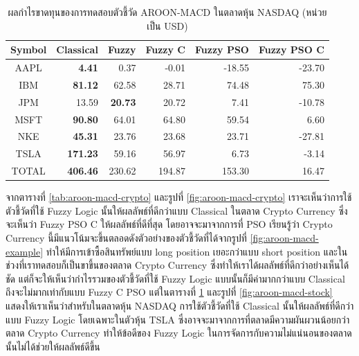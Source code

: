 \begin{table}[!h]
    \centering
    \begin{tabular}{crrrrr}
        \hline
        \textbf{Symbol} & \textbf{Classical} & \textbf{Fuzzy} & \textbf{Fuzzy C} & \textbf{Fuzzy PSO} & \textbf{Fuzzy PSO C} \\ \hline
        AAPL            & \textbf{4.41}      & 0.37           & -0.01            & -18.55             & -23.70               \\ \hline
        IBM             & \textbf{81.12}     & 62.58          & 28.71            & 74.48              & 75.30                \\ \hline
        JPM             & 13.59              & \textbf{20.73} & 20.72            & 7.41               & -10.78               \\ \hline
        MSFT            & \textbf{90.80}     & 64.01          & 64.80            & 59.54              & 6.60                 \\ \hline
        NKE             & \textbf{45.31}     & 23.76          & 23.68            & 23.71              & -27.81               \\ \hline
        TSLA            & \textbf{171.23}    & 59.16          & 56.97            & 6.73               & -3.14                \\ \hline
        TOTAL           & \textbf{406.46}    & 230.62         & 194.87           & 153.30             & 16.47                \\ \hline
    \end{tabular}
    \caption{ผลกำไรขาดทุนของการทดสอบตัวชี้วัด AROON-MACD ในตลาดหุ้น NASDAQ (หน่วยเป็น USD)}
    \label{tab:aroon-macd-stocks}
\end{table}

จากตารางที่ \ref{tab:aroon-macd-crypto} และรูปที่ \ref{fig:aroon-macd-crypto} เราจะเห็นว่าการใช้ตัวชี้วัดที่ใช้ Fuzzy Logic นั้นให้ผลลัพธ์ที่ดีกว่าแบบ Classical ในตลาด Crypto Currency ซึ่งจะเห็นว่า Fuzzy PSO C ให้ผลลัพธ์ที่ดีที่สุด โดยอาจจะมาจากการที่ PSO เรียนรู้ว่า Crypto Currency นี้มีแนวโน้มจะขึ้นตลอดดังตัวอย่างของตัวชี้วัดที่ได้จากรูปที่ \ref{fig:aroon-macd-example} ทำให้มีการเข้าซื้อสินทรัพย์แบบ long position เยอะกว่าแบบ short position และในช่วงที่เราทดสอบก็เป็นขาขึ้นของตลาด Crypto Currency ซึ่งทำให้เราได้ผลลัพธ์ที่ดีกว่าอย่างเห็นได้ชัด แต่ก็จะให้เห็นว่ากำไรรวมของตัวชี้วัดที่ใช้ Fuzzy Logic แบบนั้นก็มีค่ามากกว่าแบบ Classical ถึงจะไม่มากเท่ากับแบบ Fuzzy C PSO แต่ในตารางที่ \ref{tab:aroon-macd-stocks} และรูปที่ \ref{fig:aroon-macd-stock} แสดงให้เราเห็นว่าสำหรับในตลาดหุ้น NASDAQ การใช้ตัวชี้วัดที่ใช้ Classical นั้นให้ผลลัพธ์ที่ดีกว่าแบบ Fuzzy Logic โดยเฉพาะในตัวหุ้น TSLA ซึ่งอาจจะมาจากการที่ตลาดมีความผันผวนน้อยกว่าตลาด Crypto Currency ทำให้ข้อดีของ Fuzzy Logic ในการจัดการกับความไม่แน่นอนของตลาดนั้นไม่ได้ช่วยให้ผลลัพธ์ดีขึ้น

